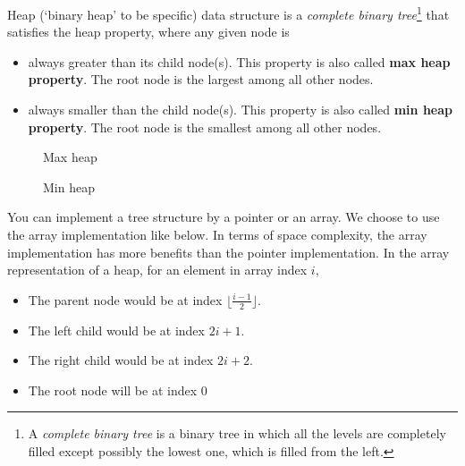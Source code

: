 \documentclass[a4paper,11pt]{book}
\begin{document}
\noindent Heap (`binary heap' to be specific) data structure is a \textit{complete binary tree}\footnote{A \textit{complete binary tree} is a binary tree in which all the levels are completely filled except possibly the lowest one, which is filled from the left.} that satisfies the heap property, where any given node is
\begin{itemize}
    \item always greater than its child node(s). This property is also called \textbf{max heap property}. The root node is the largest among all other nodes.
    \item always smaller than the child node(s). This property is also called \textbf{min heap property}. The root node is the smallest among all other nodes.
\end{itemize}

\begin{figure}[ht]
\centering
{}
\caption{Max heap}
\end{figure}

\begin{figure}[ht]
\centering
{}
\caption{Min heap}
\end{figure}

\noindent You can implement a tree structure by a pointer or an array. We choose to use the array implementation like below. In terms of space complexity, the array implementation has more benefits than the pointer implementation. In the array representation of a heap, for an element in array index $i$,
\begin{itemize}
    \item The parent node would be at index $\lfloor  \frac{i-1}{2}\rfloor$.
    \item The left child would be at index $2i + 1$.
    \item The right child would be at index $2i + 2$.
    \item The root node will be at index 0
\end{itemize}
\end{document}

